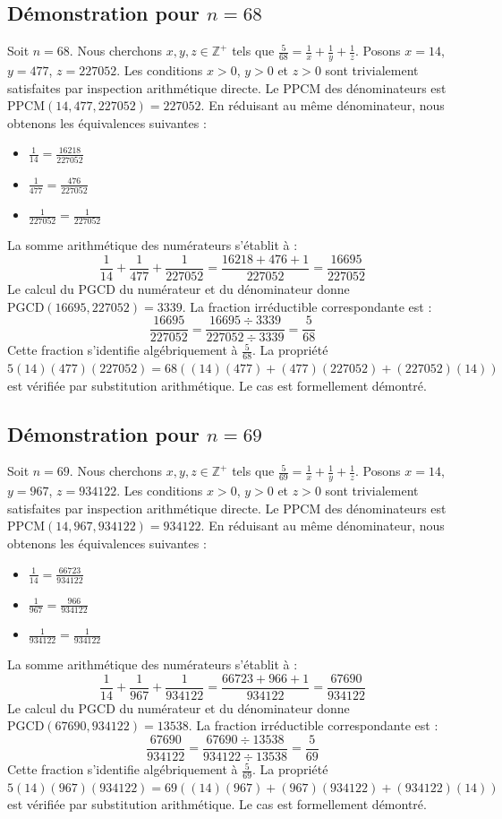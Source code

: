 \documentclass[12pt,a4paper]{article}
\begin{document}
\subsection{Démonstration pour $n = 68$}
Soit $n = 68$. Nous cherchons $x, y, z \in \mathbb{Z}^{+}$ tels que $\frac{5}{68} = \frac{1}{x} + \frac{1}{y} + \frac{1}{z}$.
Posons $x = 14$, $y = 477$, $z = 227052$.
Les conditions $x > 0$, $y > 0$ et $z > 0$ sont trivialement satisfaites par inspection arithmétique directe.
Le PPCM des dénominateurs est $\text{PPCM}(14, 477, 227052) = 227052$.
En réduisant au même dénominateur, nous obtenons les équivalences suivantes :
\begin{itemize}
    \item $\frac{1}{14} = \frac{16218}{227052}$
    \item $\frac{1}{477} = \frac{476}{227052}$
    \item $\frac{1}{227052} = \frac{1}{227052}$
\end{itemize}
La somme arithmétique des numérateurs s'établit à :
$$ \frac{1}{14} + \frac{1}{477} + \frac{1}{227052} = \frac{16218 + 476 + 1}{227052} = \frac{16695}{227052} $$
Le calcul du PGCD du numérateur et du dénominateur donne $\text{PGCD}(16695, 227052) = 3339$.
La fraction irréductible correspondante est :
$$ \frac{16695}{227052} = \frac{16695 \div 3339}{227052 \div 3339} = \frac{5}{68} $$
Cette fraction s'identifie algébriquement à $\frac{5}{68}$.
La propriété $5(14)(477)(227052) = 68((14)(477) + (477)(227052) + (227052)(14))$ est vérifiée par substitution arithmétique.
Le cas est formellement démontré.

\subsection{Démonstration pour $n = 69$}
Soit $n = 69$. Nous cherchons $x, y, z \in \mathbb{Z}^{+}$ tels que $\frac{5}{69} = \frac{1}{x} + \frac{1}{y} + \frac{1}{z}$.
Posons $x = 14$, $y = 967$, $z = 934122$.
Les conditions $x > 0$, $y > 0$ et $z > 0$ sont trivialement satisfaites par inspection arithmétique directe.
Le PPCM des dénominateurs est $\text{PPCM}(14, 967, 934122) = 934122$.
En réduisant au même dénominateur, nous obtenons les équivalences suivantes :
\begin{itemize}
    \item $\frac{1}{14} = \frac{66723}{934122}$
    \item $\frac{1}{967} = \frac{966}{934122}$
    \item $\frac{1}{934122} = \frac{1}{934122}$
\end{itemize}
La somme arithmétique des numérateurs s'établit à :
$$ \frac{1}{14} + \frac{1}{967} + \frac{1}{934122} = \frac{66723 + 966 + 1}{934122} = \frac{67690}{934122} $$
Le calcul du PGCD du numérateur et du dénominateur donne $\text{PGCD}(67690, 934122) = 13538$.
La fraction irréductible correspondante est :
$$ \frac{67690}{934122} = \frac{67690 \div 13538}{934122 \div 13538} = \frac{5}{69} $$
Cette fraction s'identifie algébriquement à $\frac{5}{69}$.
La propriété $5(14)(967)(934122) = 69((14)(967) + (967)(934122) + (934122)(14))$ est vérifiée par substitution arithmétique.
Le cas est formellement démontré.
\end{document}
